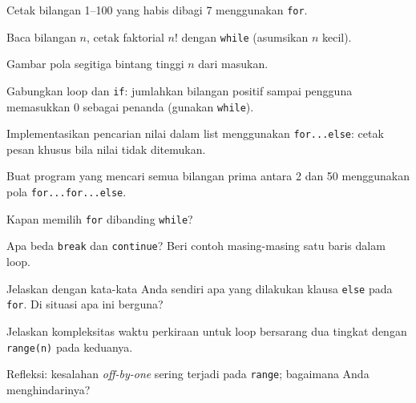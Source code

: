 ﻿\documentclass[../main.tex]{subfiles}
\begin{document}
\begin{aktivitas}
  \item Cetak bilangan 1--100 yang habis dibagi 7 menggunakan \texttt{for}.
  \item Baca bilangan $n$, cetak faktorial $n!$ dengan \texttt{while} (asumsikan $n$ kecil).
  \item Gambar pola segitiga bintang tinggi $n$ dari masukan.
  \item Gabungkan loop dan \texttt{if}: jumlahkan bilangan positif sampai pengguna memasukkan 0 sebagai penanda (gunakan \texttt{while}).
  \item Implementasikan pencarian nilai dalam list menggunakan \texttt{for...else}: cetak pesan khusus bila nilai tidak ditemukan.
  \item Buat program yang mencari semua bilangan prima antara 2 dan 50 menggunakan pola \texttt{for...for...else}.
\end{aktivitas}

\begin{latihan}
  \item Kapan memilih \texttt{for} dibanding \texttt{while}?
  \item Apa beda \texttt{break} dan \texttt{continue}? Beri contoh masing-masing satu baris dalam loop.
  \item Jelaskan dengan kata-kata Anda sendiri apa yang dilakukan klausa \texttt{else} pada \texttt{for}. Di situasi apa ini berguna?
  \item Jelaskan kompleksitas waktu perkiraan untuk loop bersarang dua tingkat dengan \texttt{range(n)} pada keduanya.
  \item Refleksi: kesalahan \textit{off-by-one} sering terjadi pada \texttt{range}; bagaimana Anda menghindarinya?
\end{latihan}
\end{document}
